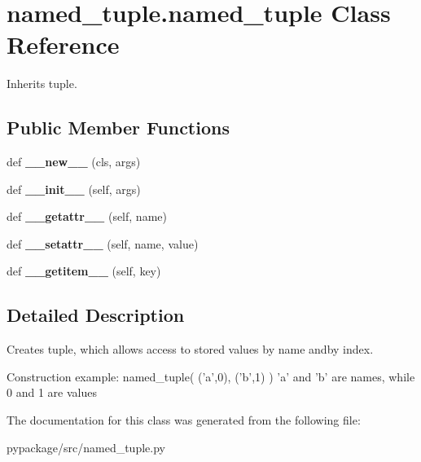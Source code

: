 \hypertarget{classnamed__tuple_1_1named__tuple}{}\section{named\+\_\+tuple.\+named\+\_\+tuple Class Reference}
\label{classnamed__tuple_1_1named__tuple}


Inherits tuple.

\subsection*{Public Member Functions}
\begin{DoxyCompactItemize}
\item 
def {\bfseries \+\_\+\+\_\+new\+\_\+\+\_\+} (cls, args)\hypertarget{classnamed__tuple_1_1named__tuple_a2ff993c4e5e628eff68bae056f19fdc6}{}\label{classnamed__tuple_1_1named__tuple_a2ff993c4e5e628eff68bae056f19fdc6}

\item 
def {\bfseries \+\_\+\+\_\+init\+\_\+\+\_\+} (self, args)\hypertarget{classnamed__tuple_1_1named__tuple_add62976d54fa85db6c0bd14d9283f27c}{}\label{classnamed__tuple_1_1named__tuple_add62976d54fa85db6c0bd14d9283f27c}

\item 
def {\bfseries \+\_\+\+\_\+getattr\+\_\+\+\_\+} (self, name)\hypertarget{classnamed__tuple_1_1named__tuple_a3338a4b5ed7a3eea17048c4c152f0441}{}\label{classnamed__tuple_1_1named__tuple_a3338a4b5ed7a3eea17048c4c152f0441}

\item 
def {\bfseries \+\_\+\+\_\+setattr\+\_\+\+\_\+} (self, name, value)\hypertarget{classnamed__tuple_1_1named__tuple_a84b0f19d82b86db51ea5d9db99dd0f2b}{}\label{classnamed__tuple_1_1named__tuple_a84b0f19d82b86db51ea5d9db99dd0f2b}

\item 
def {\bfseries \+\_\+\+\_\+getitem\+\_\+\+\_\+} (self, key)\hypertarget{classnamed__tuple_1_1named__tuple_aa948faad13b098cbbab446e0998e3ab3}{}\label{classnamed__tuple_1_1named__tuple_aa948faad13b098cbbab446e0998e3ab3}

\end{DoxyCompactItemize}


\subsection{Detailed Description}
\begin{DoxyVerb}Creates tuple, which allows access to stored values by name and\or by index.

Construction example: named_tuple( ('a',0), ('b',1) )
    'a' and 'b' are names, while 0 and 1 are values
\end{DoxyVerb}
 

The documentation for this class was generated from the following file\+:\begin{DoxyCompactItemize}
\item 
pypackage/src/named\+\_\+tuple.\+py\end{DoxyCompactItemize}
